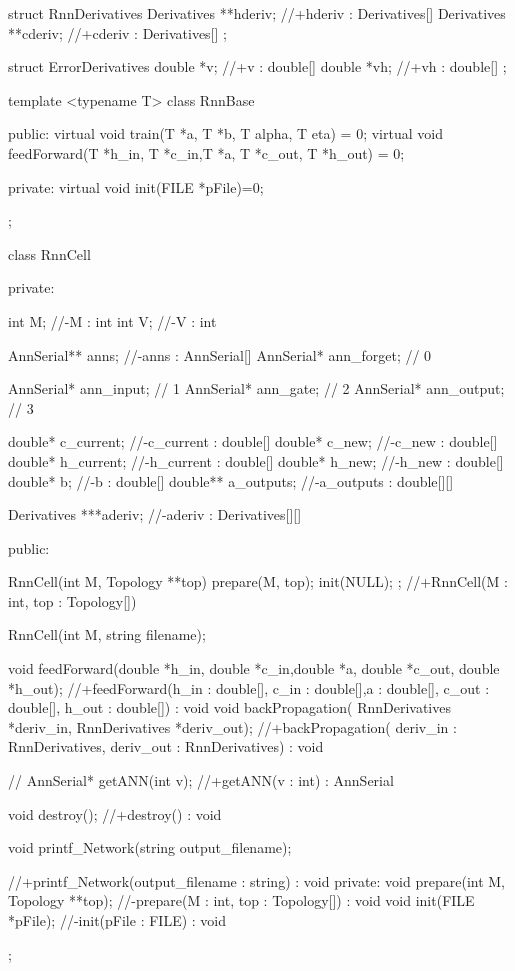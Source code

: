 struct RnnDerivatives {
  Derivatives **hderiv;
  //+hderiv : Derivatives[]
  Derivatives **cderiv;
  //+cderiv : Derivatives[]
};

struct ErrorDerivatives {
  double *v;
  //+v : double[]
  double *vh;
  //+vh : double[]
};

template <typename T>
class RnnBase {
  public:
  	 virtual void train(T *a, T *b, T alpha, T eta) = 0;
  	 virtual void feedForward(T *h\_in, T *c\_in,T *a, T *c\_out, T *h\_out) = 0;


  private:
     virtual	void init(FILE *pFile)=0;
};


class RnnCell {
  private:

    int M;
    //-M : int
    int V;
    //-V : int

    AnnSerial** anns;
    //-anns : AnnSerial[]
    AnnSerial* ann\_forget; // 0

    AnnSerial* ann\_input; // 1
    AnnSerial* ann\_gate; // 2
    AnnSerial* ann\_output; // 3

    double* c\_current;
    //-c\_current : double[]
    double* c\_new;
    //-c\_new : double[]
    double* h\_current;
    //-h\_current : double[]
    double* h\_new;
    //-h\_new : double[]
    double* b;
    //-b : double[]
    double** a\_outputs;
    //-a\_outputs : double[][]

    Derivatives ***aderiv;
    //-aderiv : Derivatives[][]




  public:

    RnnCell(int M, Topology **top) {
      prepare(M, top);
      init(NULL);
    };
    //+RnnCell(M : int, top : Topology[])


    RnnCell(int M, string filename);



  	 void feedForward(double *h\_in, double *c\_in,double *a, double *c\_out, double *h\_out);
     //+feedForward(h\_in : double[], c\_in : double[],a : double[], c\_out : double[], h\_out : double[]) : void
     void backPropagation( RnnDerivatives *deriv\_in, RnnDerivatives *deriv\_out);
     //+backPropagation( deriv\_in : RnnDerivatives, deriv\_out : RnnDerivatives) : void

    //
    AnnSerial* getANN(int v);
    //+getANN(v : int) : AnnSerial

    void destroy();
    //+destroy() : void

    void printf\_Network(string output\_filename);

    //+printf\_Network(output\_filename : string) : void
  private:
    void prepare(int M, Topology **top);
    //-prepare(M : int, top : Topology[]) : void
    void init(FILE *pFile);
    //-init(pFile : FILE) : void

};


